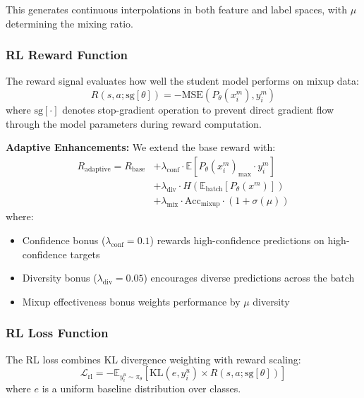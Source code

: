 \documentclass{scrartcl}
\begin{document}
This generates continuous interpolations in both feature and label spaces, with $\mu$ determining the mixing ratio.

\subsubsection{RL Reward Function}

The reward signal evaluates how well the student model performs on mixup data:
\begin{equation}
R(s, a; \text{sg}[\theta]) = -\text{MSE}(P_\theta(x_i^m), y_i^m)
\end{equation}
where $\text{sg}[\cdot]$ denotes stop-gradient operation to prevent direct gradient flow through the model parameters during reward computation.

\textbf{Adaptive Enhancements:} We extend the base reward with:
\begin{align}
R_{\text{adaptive}} = R_{\text{base}} &+ \lambda_{\text{conf}} \cdot \mathbb{E}[P_\theta(x_i^m)_{\max} \cdot y_i^m] \\
&+ \lambda_{\text{div}} \cdot H(\mathbb{E}_{\text{batch}}[P_\theta(x^m)]) \\
&+ \lambda_{\text{mix}} \cdot \text{Acc}_{\text{mixup}} \cdot (1 + \sigma(\mu))
\end{align}
where:
\begin{itemize}
    \item Confidence bonus ($\lambda_{\text{conf}} = 0.1$) rewards high-confidence predictions on high-confidence targets
    \item Diversity bonus ($\lambda_{\text{div}} = 0.05$) encourages diverse predictions across the batch
    \item Mixup effectiveness bonus weights performance by $\mu$ diversity
\end{itemize}

\subsubsection{RL Loss Function}

The RL loss combines KL divergence weighting with reward scaling:
\begin{equation}
\mathcal{L}_{\text{rl}} = -\mathbb{E}_{y_i^u \sim \pi_\theta} [\text{KL}(e, y_i^u) \times R(s,a;\text{sg}[\theta])]
\end{equation}
where $e$ is a uniform baseline distribution over classes.
\end{document}
